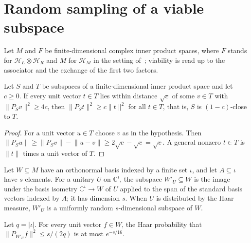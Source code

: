 \section{Random sampling of a viable subspace}

Let $M$ and $F$ be finite-dimensional complex inner product spaces, where $F$
stands for $\mathcal H_L\otimes\mathcal H_R$ and $M$ for $\mathcal H_M$ in
the setting of~\cite[lines 532--547]{Arad2016RigorousRG}; viability is read
up to the associator and the exchange of the first two factors.

\begin{theorem}
    \label{thm:viable_random_sampling_net}
    \leanok
    Let $S$ and $T$ be subspaces of a finite-dimensional inner product space
    and let $c\ge0$. If every unit vector $t\in T$ lies within distance
    $\sqrt c$ of some $v\in T$ with $\lVert P_Sv\rVert^2\ge4c$, then
    $\lVert P_St\rVert^2\ge c\lVert t\rVert^2$ for all $t\in T$, that is, $S$
    is $(1-c)$-close to $T$.
\end{theorem}

\begin{proof}
    \leanok
    For a unit vector $u\in T$ choose $v$ as in the hypothesis. Then
    $\lVert P_Su\rVert\ge\lVert P_Sv\rVert-\lVert u-v\rVert
        \ge2\sqrt c-\sqrt c=\sqrt c$. A general nonzero $t\in T$ is
    $\lVert t\rVert$ times a unit vector of $T$.
\end{proof}

\begin{definition}
    \label{def:viable_random_subspace}
    \leanok
    Let $W\subseteq M$ have an orthonormal basis indexed by a finite set
    $\iota$, and let $A\subseteq\iota$ have $s$ elements. For a unitary $U$
    on $\mathbb C^\iota$, the subspace $W'_U\subseteq W$ is the image under
    the basis isometry $\mathbb C^\iota\to W$ of $U$ applied to the span of
    the standard basis vectors indexed by $A$; it has dimension $s$. When $U$ is distributed by the
    Haar measure, $W'_U$ is a uniformly random $s$-dimensional subspace of
    $W$.
\end{definition}

\begin{theorem}
    \label{thm:viable_random_sampling_one_vector}
    \leanok
    Let $q=\lvert\iota\rvert$. For every unit vector $f\in W$, the Haar
    probability that $\lVert P_{W'_U}f\rVert^2\le s/(2q)$ is at most
    $e^{-s/16}$.
\end{theorem}

